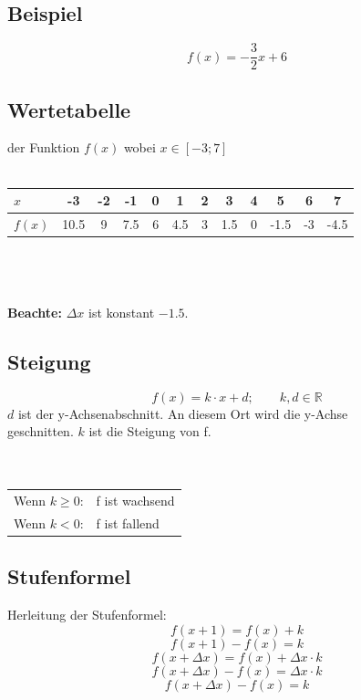 \documentclass[12pt,a4paper]{scrbook}
\begin{document}
\subsection{Beispiel}
\[f(x) = -\frac{3}{2}x + 6\]

\subsection{Wertetabelle} der Funktion $f(x)$ wobei $x \in [-3; 7]$\\\\
\begin{tabular}{l||c|c|c|c|c|c|c|c|c|c|c}
$x$ & -3 & -2 & -1 & 0 & 1 & 2 & 3 & 4 & 5 & 6 & 7\\
\hline
$f(x)$ & 10.5 & 9 & 7.5 & 6 & 4.5 & 3 & 1.5 & 0 & -1.5 & -3 & -4.5\\
\end{tabular}\\\\\\
\textbf{Beachte:} $\Delta x$ ist konstant $-1.5$.\\

\subsection{Steigung}
\[f(x) = k\cdot x + d; \quad\quad k,d \in \mathbb{R}\]
$d$ ist der y-Achsenabschnitt. An diesem Ort wird die y-Achse\\
geschnitten. $k$ ist die Steigung von f.\\\\\\
\begin{tabular}{ll}
Wenn $k \geq 0$: & f ist wachsend\\
Wenn $k < 0$: & f ist fallend\\
\end{tabular}

\subsection{Stufenformel}
Herleitung der Stufenformel:
\[f(x+1) = f(x) + k\]
\[f(x+1) - f(x) = k\]
\[f(x+\Delta x) = f(x) + \Delta x \cdot k\]
\[f(x+\Delta x) - f(x) = \Delta x \cdot k\]
\[f(x+\Delta x) - f(x) = k\]

\begin{center}
\fbox{\parbox{4cm}{\[\frac{\Delta y}{\Delta x} = k\]}}
\end{center}
\end{document}

